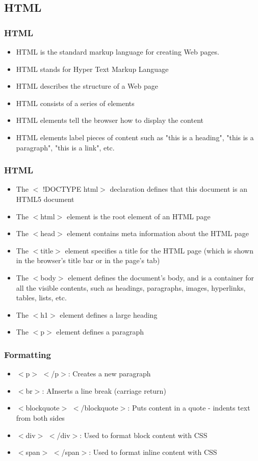 \documentclass{beamer}
\begin{document}
\subsection{HTML}
\begin{frame}
\frametitle{HTML}
\begin{itemize}
 \item HTML is the standard markup language for creating Web pages.
 \item HTML stands for Hyper Text Markup Language
\item HTML describes the structure of a Web page
\item HTML consists of a series of elements
\item HTML elements tell the browser how to display the content
\item HTML elements label pieces of content such as "this is a heading", "this is a paragraph", "this is a link", etc.
\end{itemize}
\end{frame}
\begin{frame}
\frametitle{HTML}
\begin{itemize}
 \item The $<$ !DOCTYPE html$>$ declaration defines that this document is an HTML5 document
\item The $<$html$>$ element is the root element of an HTML page
\item The $<$head$>$ element contains meta information about the HTML page
\item The $<$title$>$ element specifies a title for the HTML page (which is shown in the browser's title bar or in the page's tab)
\item The $<$body$>$ element defines the document's body, and is a container for all the visible contents, such as headings, paragraphs, images, hyperlinks, tables, lists, etc.
\item The $<$h1$>$ element defines a large heading
\item The $<$p$>$ element defines a paragraph

\end{itemize}
\end{frame}
\begin{frame}
\frametitle{Formatting}
\begin{itemize}
 \item   $<$p$>$ $<$/p$>$:  Creates a new paragraph
 \item   $<$br$>$:  AInserts a line break (carriage return)
  \item  $<$blockquote$>$ $<$/blockquote$>$:  Puts content in a quote - indents text from both sides
  \item  $<$div$>$ $<$/div$>$: Used to format block content with CSS
  \item  $<$span$>$ $<$/span$>$: Used to format inline content with CSS
\end{itemize}
\end{frame}
\end{document}
